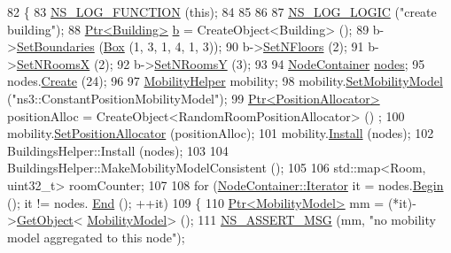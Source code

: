 \begin{DoxyCode}
82 \{
83   \hyperlink{log-macros-disabled_8h_a90b90d5bad1f39cb1b64923ea94c0761}{NS\_LOG\_FUNCTION} (\textcolor{keyword}{this});
84 
85  
86 
87   \hyperlink{group__logging_ga88acd260151caf2db9c0fc84997f45ce}{NS\_LOG\_LOGIC} (\textcolor{stringliteral}{"create building"});
88   \hyperlink{classns3_1_1Ptr}{Ptr<Building>} \hyperlink{buildings__pathloss_8m_a21ad0bd836b90d08f4cf640b4c298e7c}{b} = CreateObject<Building> ();
89   b->\hyperlink{classns3_1_1Building_a4b69659f05a983f06e33e7db62415915}{SetBoundaries} (\hyperlink{classns3_1_1Box}{Box} (1, 3, 1, 4, 1, 3));
90   b->\hyperlink{classns3_1_1Building_ae9f97075b5c8bf4685703e30ed049791}{SetNFloors} (2);
91   b->\hyperlink{classns3_1_1Building_a60eac680f1059fb9d883a659607e2fae}{SetNRoomsX} (2);
92   b->\hyperlink{classns3_1_1Building_a9103ee5b5edf013624d7e18422c4ba06}{SetNRoomsY} (3);
93 
94   \hyperlink{classns3_1_1NodeContainer}{NodeContainer} \hyperlink{visualizer-ideas_8txt_a3e1b3808014a2c68ab0cd0182e041be2}{nodes};
95   nodes.\hyperlink{classns3_1_1NodeContainer_a787f059e2813e8b951cc6914d11dfe69}{Create} (24);
96 
97   \hyperlink{classns3_1_1MobilityHelper}{MobilityHelper} mobility;
98   mobility.\hyperlink{classns3_1_1MobilityHelper_a030275011b6f40682e70534d30280aba}{SetMobilityModel} (\textcolor{stringliteral}{"ns3::ConstantPositionMobilityModel"});
99   \hyperlink{classns3_1_1Ptr}{Ptr<PositionAllocator>} positionAlloc = CreateObject<RandomRoomPositionAllocator> ()
      ;
100   mobility.\hyperlink{classns3_1_1MobilityHelper_ac59d5295076be3cc11021566713a28c5}{SetPositionAllocator} (positionAlloc);
101   mobility.\hyperlink{classns3_1_1MobilityHelper_a07737960ee95c0777109cf2994dd97ae}{Install} (nodes);
102   BuildingsHelper::Install (nodes);
103 
104   BuildingsHelper::MakeMobilityModelConsistent ();
105 
106   std::map<Room, uint32\_t> roomCounter;
107 
108   \textcolor{keywordflow}{for} (\hyperlink{classns3_1_1NodeContainer_aa1a9f2d2b09bfef7d066d3974bca2cc4}{NodeContainer::Iterator} it = nodes.\hyperlink{classns3_1_1NodeContainer_adf0f639aff139db107526288777eb533}{Begin} (); it != nodes.
      \hyperlink{classns3_1_1NodeContainer_a8ea0bcac137597d192c5e6b95ca60464}{End} (); ++it)
109     \{
110       \hyperlink{classns3_1_1Ptr}{Ptr<MobilityModel>} mm = (*it)->\hyperlink{classns3_1_1Object_a13e18c00017096c8381eb651d5bd0783}{GetObject}<
      \hyperlink{classns3_1_1MobilityModel}{MobilityModel}> ();
111       \hyperlink{assert_8h_aff5ece9066c74e681e74999856f08539}{NS\_ASSERT\_MSG} (mm, \textcolor{stringliteral}{"no mobility model aggregated to this node"});

\end{DoxyCode}
